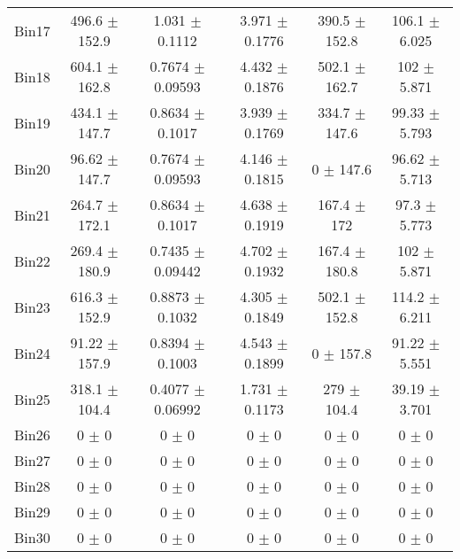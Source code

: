 \begin{tabular}{@{\extracolsep{4pt}}lccccc@{}}
     Bin17 & 496.6 $\pm$ 152.9 & 1.031 $\pm$ 0.1112 & 3.971 $\pm$ 0.1776 & 390.5 $\pm$ 152.8 & 106.1 $\pm$ 6.025 \\ 
     Bin18 & 604.1 $\pm$ 162.8 & 0.7674 $\pm$ 0.09593 & 4.432 $\pm$ 0.1876 & 502.1 $\pm$ 162.7 & 102 $\pm$ 5.871 \\ 
     Bin19 & 434.1 $\pm$ 147.7 & 0.8634 $\pm$ 0.1017 & 3.939 $\pm$ 0.1769 & 334.7 $\pm$ 147.6 & 99.33 $\pm$ 5.793 \\ 
     Bin20 & 96.62 $\pm$ 147.7 & 0.7674 $\pm$ 0.09593 & 4.146 $\pm$ 0.1815 & 0 $\pm$ 147.6 & 96.62 $\pm$ 5.713 \\ 
     Bin21 & 264.7 $\pm$ 172.1 & 0.8634 $\pm$ 0.1017 & 4.638 $\pm$ 0.1919 & 167.4 $\pm$ 172 & 97.3 $\pm$ 5.773 \\ 
     Bin22 & 269.4 $\pm$ 180.9 & 0.7435 $\pm$ 0.09442 & 4.702 $\pm$ 0.1932 & 167.4 $\pm$ 180.8 & 102 $\pm$ 5.871 \\ 
     Bin23 & 616.3 $\pm$ 152.9 & 0.8873 $\pm$ 0.1032 & 4.305 $\pm$ 0.1849 & 502.1 $\pm$ 152.8 & 114.2 $\pm$ 6.211 \\ 
     Bin24 & 91.22 $\pm$ 157.9 & 0.8394 $\pm$ 0.1003 & 4.543 $\pm$ 0.1899 & 0 $\pm$ 157.8 & 91.22 $\pm$ 5.551 \\ 
     Bin25 & 318.1 $\pm$ 104.4 & 0.4077 $\pm$ 0.06992 & 1.731 $\pm$ 0.1173 & 279 $\pm$ 104.4 & 39.19 $\pm$ 3.701 \\ 
     Bin26 & 0 $\pm$ 0 & 0 $\pm$ 0 & 0 $\pm$ 0 & 0 $\pm$ 0 & 0 $\pm$ 0 \\ 
     Bin27 & 0 $\pm$ 0 & 0 $\pm$ 0 & 0 $\pm$ 0 & 0 $\pm$ 0 & 0 $\pm$ 0 \\ 
     Bin28 & 0 $\pm$ 0 & 0 $\pm$ 0 & 0 $\pm$ 0 & 0 $\pm$ 0 & 0 $\pm$ 0 \\ 
     Bin29 & 0 $\pm$ 0 & 0 $\pm$ 0 & 0 $\pm$ 0 & 0 $\pm$ 0 & 0 $\pm$ 0 \\ 
     Bin30 & 0 $\pm$ 0 & 0 $\pm$ 0 & 0 $\pm$ 0 & 0 $\pm$ 0 & 0 $\pm$ 0 \\ 
\hline\hline
  \end{tabular}
